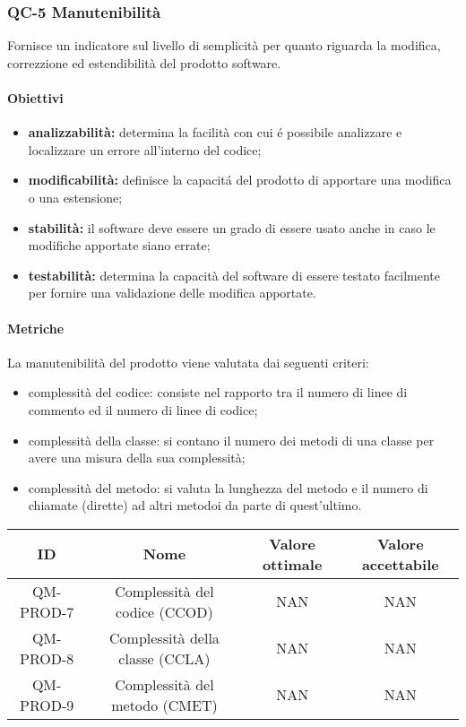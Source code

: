 \subsubsection{QC-5 Manutenibilità}
Fornisce un indicatore sul livello di semplicità per quanto riguarda la modifica, correzzione ed estendibilità del prodotto software.
	\paragraph{Obiettivi}
		\begin{itemize}
			\item \textbf{analizzabilità:} determina la facilità con cui é possibile analizzare e localizzare un errore all'interno del codice;
			\item \textbf{modificabilità:} definisce la capacitá del prodotto di apportare una modifica o una estensione;
			\item \textbf{stabilità:} il software deve essere un grado di essere usato anche in caso le modifiche apportate siano errate;
			\item \textbf{testabilità:} determina la capacità del software di essere testato facilmente per fornire una validazione delle modifica apportate.
		\end{itemize}
	\paragraph{Metriche}
	La manutenibilità del prodotto viene valutata dai seguenti criteri:
	\begin{itemize}
		\item complessità del codice: consiste nel rapporto tra il numero di linee di commento ed il numero di linee di codice;
		\item complessità della classe: si contano il numero dei metodi di una classe per avere una misura della sua complessità;
		\item complessità del metodo: si valuta la lunghezza del metodo e il numero di chiamate (dirette) ad altri metodoi da parte di quest'ultimo.
	\end{itemize}
	\begin{center}
		\begin{tabular}{|c|c|c|c|}
			\rowcolor{lighter-grayer}
			\hline
			ID & Nome & Valore ottimale & Valore accettabile \\
			\hline
			QM-PROD-7 & Complessità del codice (CCOD) & NAN & NAN \\
			\hline
			QM-PROD-8 & Complessità della classe (CCLA) & NAN & NAN \\
			\hline
			QM-PROD-9 & Complessità del metodo (CMET) & NAN & NAN \\
			\hline
		\end{tabular}
	\end{center}

